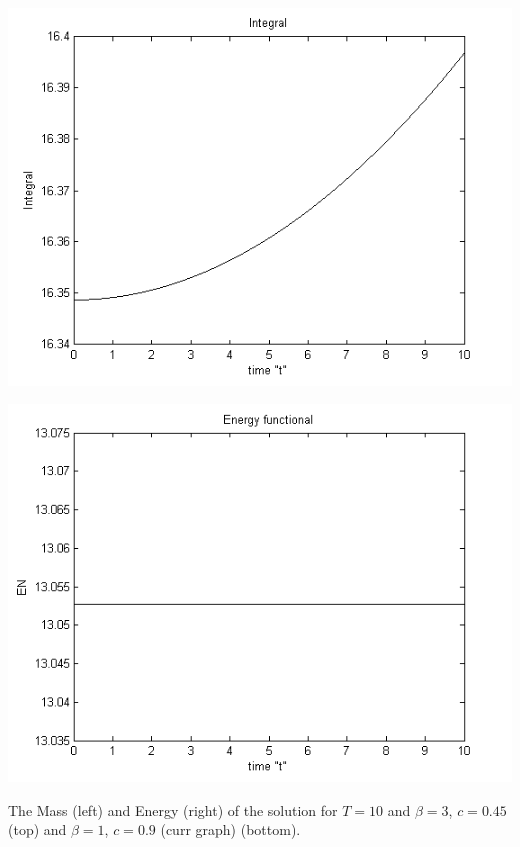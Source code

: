 \documentclass{beamer}
\begin{document}
\begin{frame}
\begin{center}
\begin{minipage}[b]{0.25\linewidth}
	\end{minipage}
\\
	\begin{minipage}[b]{0.25\linewidth}
		 \includegraphics[width=\linewidth]{figures/Integral.png}
	\end{minipage}	
	\begin{minipage}[b]{0.25\linewidth}
		\includegraphics[width=\linewidth]{figures/Energy.png}
		
	\end{minipage}

\end{center}
The Mass (left) and Energy (right) of the solution for $T = 10$ and $\beta=3$, $c = 0.45$ (top) and $\beta=1$, $c = 0.9$ (curr graph) (bottom).
\end{frame}
\end{document}

